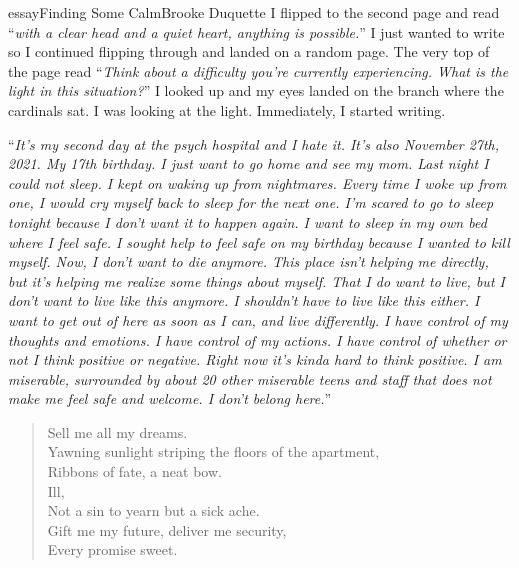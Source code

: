 \begin{prose}{essay}{Finding Some Calm}{Brooke Duquette}
    I flipped to the second page and read “\textit{with a clear head and a quiet heart, anything is possible.}” I just wanted to write so I continued flipping through and landed on a random page. The very top of the page read “\textit{Think about a difficulty you're currently experiencing. What is the light in this situation?}” I looked up and my eyes landed on the branch where the cardinals sat. I was looking at the light. Immediately, I started writing.\par
    “\textit{It's my second day at the psych hospital and I hate it. It's also November 27th, 2021. My 17th birthday. I just want to go home and see my mom. Last night I could not sleep. I kept on waking up from nightmares. Every time I woke up from one, I would cry myself back to sleep for the next one. I'm scared to go to sleep tonight because I don't want it to happen again. I want to sleep in my own bed where I feel safe. I sought help to feel safe on my birthday because I wanted to kill myself. Now, I don't want to die anymore. This place isn't helping me directly, but it's helping me realize some things about myself. That I do want to live, but I don't want to live like this anymore. I shouldn't have to live like this either. I want to get out of here as soon as I can, and live differently. I have control of my thoughts and emotions. I have control of my actions. I have control of whether or not I think positive or negative. Right now it's kinda hard to think positive. I am miserable, surrounded by about 20 other miserable teens and staff that does not make me feel safe and welcome. I don't belong here.}”
\end{prose}


\clearpage
\setauthor{}


\begin{verse}
    Sell me all my dreams.\\
    Yawning sunlight striping the floors of the apartment,\\
    Ribbons of fate, a neat bow.\\
    Ill,\\
    Not a sin to yearn but a sick ache.\\
    Gift me my future, deliver me security,\\
    Every promise sweet.\\
\end{verse}


